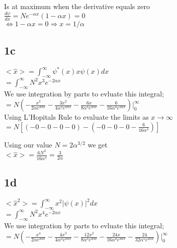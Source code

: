 \documentclass{article}
\begin{document}
Is at maximum when the derivative equals zero\\

$\frac{d\psi}{dx}=Ne^{-\alpha x}(1-\alpha x)=0$\\

$\Leftrightarrow 1-\alpha x=0\Rightarrow x=1/\alpha$\\

\subsection*{1c}

$<\hat{x}>=\int_{-\infty}^{\infty}\psi^*(x)x\psi(x)dx$\\

$=\int_{-\infty}^{\infty}N^2x^3e^{-2\alpha x}$\\

We use integration by parts to evluate this integral;\\

$=N(-\frac{x^3}{2\alpha e^{2\alpha x}}-\frac{3x^2}{4\alpha^2 e^{2\alpha x}}-\frac{6x}{8\alpha^3 e^{2\alpha x}}-\frac{6}{16\alpha^4 e^{2\alpha x}})|_0^\infty$\\

Using L'Hopitals Rule to evaluate the limits as $x\rightarrow\infty$\\

$=N[(-0-0-0-0)-(-0-0-0-\frac{6}{16\alpha^4})]$

Using our value $N=2\alpha^{3/2}$ we get \\

$<\hat{x}>=\frac{6N^2}{16\alpha^4}=\frac{3}{2\alpha}$\\

\subsection*{1d}

$<\hat{x}^2>=\int_{-\infty}^{\infty}x^2|\psi(x)|^2dx$\\

$=\int_{-\infty}^{\infty}N^2x^4e^{-2\alpha x}$\\

We use integration by parts to evluate this integral;\\

$=N(-\frac{x^4}{2\alpha e^{2\alpha x}}-\frac{4x^3}{4\alpha^2 e^{2\alpha x}}-\frac{12x^2}{8\alpha^3 e^{2\alpha x}}-\frac{24x}{16\alpha^4 e^{2\alpha x}}-\frac{24}{32\alpha^5 e^{2\alpha x}})|_0^\infty$\\
\end{document}
